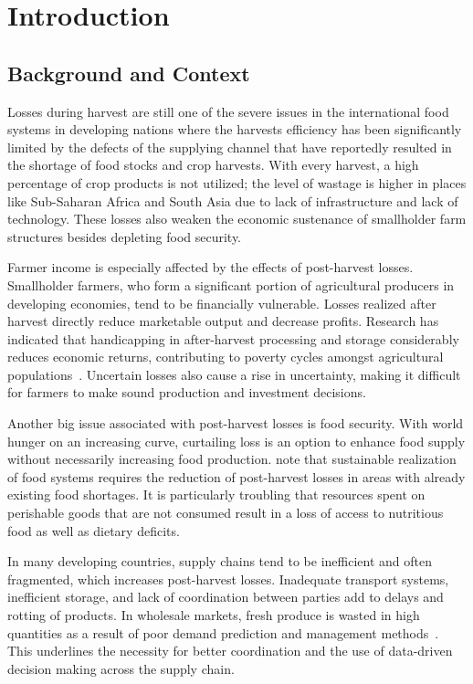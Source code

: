 \chapter{Introduction}
\label{chap:intro}

\section{Background and Context}

Losses during harvest are still one of the severe issues in the international food systems in
developing nations where the harvests efficiency has been significantly limited by the defects of
the supplying channel that have reportedly resulted in the shortage of food stocks and crop
harvests. With every harvest, a high percentage of crop products is not utilized; the level of
wastage is higher in places like Sub-Saharan Africa and South Asia due to lack of infrastructure
and lack of technology. These losses also weaken the economic sustenance of smallholder farm
structures besides depleting food security.

Farmer income is especially affected by the effects of post-harvest losses. Smallholder farmers,
who form a significant portion of agricultural producers in developing economies, tend to be
financially vulnerable. Losses realized after harvest directly reduce marketable output and
decrease profits. Research has indicated that handicapping in after-harvest processing and storage
considerably reduces economic returns, contributing to poverty cycles amongst agricultural
populations~\cite{opara2025application}. Uncertain losses also cause a rise in uncertainty,
making it difficult for farmers to make sound production and investment decisions.

Another big issue associated with post-harvest losses is food security. With world hunger on an
increasing curve, curtailing loss is an option to enhance food supply without necessarily
increasing food production. \cite{fadiji2023artificial} note that sustainable realization of food
systems requires the reduction of post-harvest losses in areas with already existing food
shortages. It is particularly troubling that resources spent on perishable goods that are not
consumed result in a loss of access to nutritious food as well as dietary deficits.

In many developing countries, supply chains tend to be inefficient and often fragmented, which
increases post-harvest losses. Inadequate transport systems, inefficient storage, and lack of
coordination between parties add to delays and rotting of products. In wholesale markets, fresh
produce is wasted in high quantities as a result of poor demand prediction and management
methods~\cite{opara2025application}. This underlines the necessity for better coordination and
the use of data-driven decision making across the supply chain.

